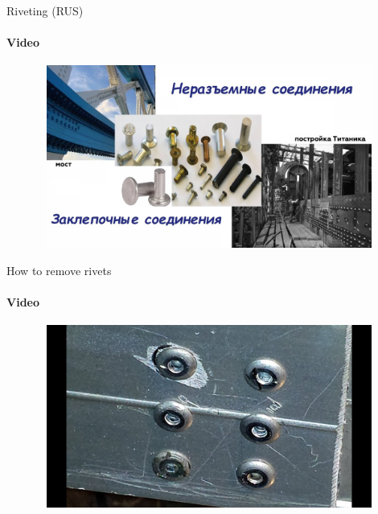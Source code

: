 \documentclass[aspectratio=169]{beamer}
\begin{document}
\begin{frame}[t]{Riveting (RUS)}
    \framesubtitle{Video}
    \vspace{-0.6cm}
    \begin{figure}[H]
        \href{https://youtu.be/H7ssVv_MtNQ}{
            \centering\includegraphics[height=6cm,width=1\textwidth,keepaspectratio]{riveting_rus_video.jpg}}
        \label{fig:riveting_rus_video.jpg}
    \end{figure}
\end{frame}

\begin{frame}[t]{How to remove rivets}
    \framesubtitle{Video}
    \vspace{-0.6cm}
    \begin{figure}[H]
        \href{https://youtu.be/uG5plvIy3wk}{
            \centering\includegraphics[height=6cm,width=1\textwidth,keepaspectratio]{rivets_umount_video.jpg}}
        \label{fig:rivets_umount_video.jpg}
    \end{figure}
\end{frame}
\end{document}
